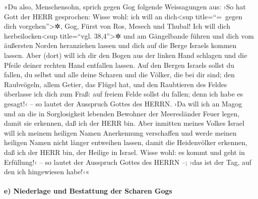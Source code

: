 »Du also, Menschensohn, sprich gegen Gog folgende
Weissagungen aus: ›So hat Gott der HERR gesprochen: Wisse wohl: ich will
an dich\textless sup title=``=~gegen dich vorgehen''\textgreater✲, Gog,
Fürst von Ros, Mesech und Thubal! Ich will dich
herbeilocken\textless sup title=``vgl. 38,4''\textgreater✲ und am
Gängelbande führen und dich vom äußersten Norden heranziehen lassen und
dich auf die Berge Israels kommen lassen. Aber (dort) will
ich dir den Bogen aus der linken Hand schlagen und die Pfeile deiner
rechten Hand entfallen lassen. Auf den Bergen Israels
sollst du fallen, du selbst und alle deine Scharen und die Völker, die
bei dir sind; den Raubvögeln, allem Getier, das Flügel hat, und den
Raubtieren des Feldes überlasse ich dich zum Fraß: auf
freiem Felde sollst du fallen; denn ich habe es gesagt!‹ -- so lautet
der Ausspruch Gottes des HERRN. ›Da will ich an Magog und
an die in Sorglosigkeit lebenden Bewohner der Meeresländer Feuer legen,
damit sie erkennen, daß ich der HERR bin. Aber inmitten
meines Volkes Israel will ich meinem heiligen Namen Anerkennung
verschaffen und werde meinen heiligen Namen nicht länger entweihen
lassen, damit die Heidenvölker erkennen, daß ich der HERR bin, der
Heilige in Israel. Wisse wohl: es kommt und geht in
Erfüllung!‹ -- so lautet der Ausspruch Gottes des HERRN --; ›das ist der
Tag, auf den ich hingewiesen habe!‹«

\hypertarget{e-niederlage-und-bestattung-der-scharen-gogs}{%
\paragraph{e) Niederlage und Bestattung der Scharen
Gogs}\label{e-niederlage-und-bestattung-der-scharen-gogs}}

